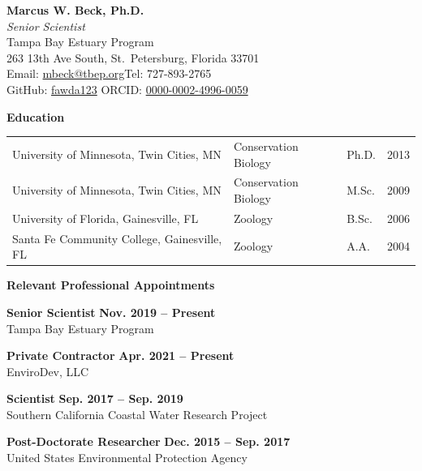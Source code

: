 \documentclass[letterpaper,12pt]{article}
\begin{document}
\begin{center}
  {\large\textbf{Marcus W. Beck, Ph.D.}}\\[3pt]
  \textit{Senior Scientist}\\[2pt]
  Tampa Bay Estuary Program\\
  263 13th Ave South, St.\ Petersburg, Florida 33701\\
  Email: \href{mailto:mbeck@tbep.org}{mbeck@tbep.org}\quad Tel: 727-893-2765\\
  GitHub: \href{https://github.com/fawda123}{fawda123}\quad
  ORCID: \href{https://orcid.org/0000-0002-4996-0059}{0000-0002-4996-0059}
\end{center}

\vspace{4pt}
\noindent\textbf{Education}

\vspace{4pt}
\begin{tabularx}{\linewidth}{@{}X p{4.6cm} p{1.4cm} r@{}}
University of Minnesota, Twin Cities, MN     & Conservation Biology & Ph.D. & 2013 \\[1pt]
University of Minnesota, Twin Cities, MN     & Conservation Biology & M.Sc. & 2009 \\[1pt]
University of Florida, Gainesville, FL       & Zoology              & B.Sc. & 2006 \\[1pt]
Santa Fe Community College, Gainesville, FL  & Zoology              & A.A.  & 2004 \\
\end{tabularx}

\vspace{8pt}
\noindent\textbf{Relevant Professional Appointments}

\vspace{2pt}
\textbf{Senior Scientist} \hfill \textbf{Nov. 2019 -- Present}\\
Tampa Bay Estuary Program

\vspace{4pt}
\textbf{Private Contractor} \hfill \textbf{Apr. 2021 -- Present}\\
EnviroDev, LLC

\vspace{2pt}
\textbf{Scientist} \hfill \textbf{Sep. 2017 -- Sep. 2019}\\
Southern California Coastal Water Research Project

\vspace{2pt}
\textbf{Post-Doctorate Researcher} \hfill \textbf{Dec. 2015 -- Sep. 2017}\\
United States Environmental Protection Agency
\end{document}
